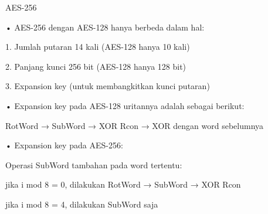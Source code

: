 \documentclass{article}
\begin{document}

AES-256

• AES-256  dengan AES-128 hanya berbeda dalam hal:

    1. Jumlah putaran 14 kali (AES-128 hanya 10 kali)

    2. Panjang kunci 256 bit (AES-128 hanya 128 bit)

    3. Expansion key (untuk membangkitkan kunci putaran)

• Expansion key pada AES-128 uritannya adalah sebagai berikut:

       RotWord → SubWord → XOR Rcon → XOR dengan word sebelumnya

• Expansion key pada AES-256: 

      Operasi SubWord tambahan pada word tertentu:

         jika i mod 8 = 0, dilakukan RotWord → SubWord → XOR Rcon 

         jika i mod 8 = 4, dilakukan SubWord saja
\end{document}

